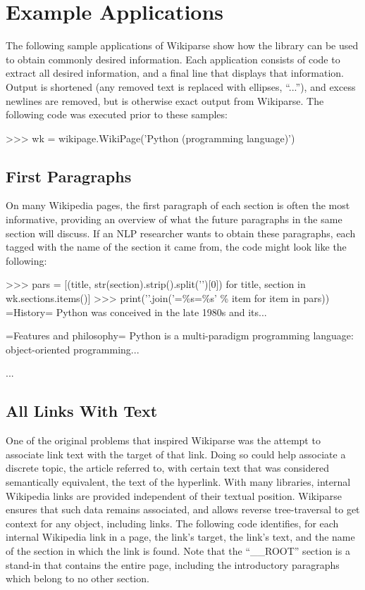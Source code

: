 
\section{Example Applications}

The following sample applications of Wikiparse show how the library can be used to obtain commonly desired information. Each application consists of code to extract all desired information, and a final line that displays that information. Output is shortened (any removed text is replaced with ellipses, ``...''), and excess newlines are removed, but is otherwise exact output from Wikiparse. The following code was executed prior to these samples:

\begin{code}
>>> wk = wikipage.WikiPage('Python (programming language)')
\end{code}

\subsection{First Paragraphs}

On many Wikipedia pages, the first paragraph of each section is often the most informative, providing an overview of what the future paragraphs in the same section will discuss. If an NLP researcher wants to obtain these paragraphs, each tagged with the name of the section it came from, the code might look like the following:

\begin{code}
>>> pars = [(title, str(section).strip().split('\n')[0]) for title, section in wk.sections.items()]
>>> print('\n\n'.join('=\%s=\n\%s' \% item for item in pars))
=History=
Python was conceived in the late 1980s and its...

=Features and philosophy=
Python is a multi-paradigm programming language: object-oriented programming...

...
\end{code}


\subsection{All Links With Text}

One of the original problems that inspired Wikiparse was the attempt to associate link text with the target of that link. Doing so could help associate a discrete topic, the article referred to, with certain text that was considered semantically equivalent, the text of the hyperlink. With many libraries, internal Wikipedia links are provided independent of their textual position. Wikiparse ensures that such data remains associated, and allows reverse tree-traversal to get context for any object, including links. The following code identifies, for each internal Wikipedia link in a page, the link's target, the link's text, and the name of the section in which the link is found. Note that the ``\_\_ROOT'' section is a stand-in that contains the entire page, including the introductory paragraphs which belong to no other section.

